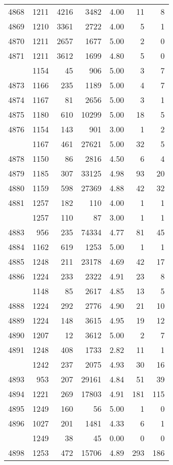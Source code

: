 \documentclass[
]{article}
\begin{document}
\begin{table}
\begin{tabular}[t]{lrrrrrr}
4868 & 1211 & 4216 & 3482 & 4.00 & 11 & 8\\
4869 & 1210 & 3361 & 2722 & 4.00 & 5 & 1\\
4870 & 1211 & 2657 & 1677 & 5.00 & 2 & 0\\
4871 & 1211 & 3612 & 1699 & 4.80 & 5 & 0\\
\addlinespace
4872 & 1154 & 45 & 906 & 5.00 & 3 & 7\\
4873 & 1166 & 235 & 1189 & 5.00 & 4 & 7\\
4874 & 1167 & 81 & 2656 & 5.00 & 3 & 1\\
4875 & 1180 & 610 & 10299 & 5.00 & 18 & 5\\
4876 & 1154 & 143 & 901 & 3.00 & 1 & 2\\
\addlinespace
4877 & 1167 & 461 & 27621 & 5.00 & 32 & 5\\
4878 & 1150 & 86 & 2816 & 4.50 & 6 & 4\\
4879 & 1185 & 307 & 33125 & 4.98 & 93 & 20\\
4880 & 1159 & 598 & 27369 & 4.88 & 42 & 32\\
4881 & 1257 & 182 & 110 & 4.00 & 1 & 1\\
\addlinespace
4882 & 1257 & 110 & 87 & 3.00 & 1 & 1\\
4883 & 956 & 235 & 74334 & 4.77 & 81 & 45\\
4884 & 1162 & 619 & 1253 & 5.00 & 1 & 1\\
4885 & 1248 & 211 & 23178 & 4.69 & 42 & 17\\
4886 & 1224 & 233 & 2322 & 4.91 & 23 & 8\\
\addlinespace
4887 & 1148 & 85 & 2617 & 4.85 & 13 & 5\\
4888 & 1224 & 292 & 2776 & 4.90 & 21 & 10\\
4889 & 1224 & 148 & 3615 & 4.95 & 19 & 12\\
4890 & 1207 & 12 & 3612 & 5.00 & 2 & 7\\
4891 & 1248 & 408 & 1733 & 2.82 & 11 & 1\\
\addlinespace
4892 & 1242 & 237 & 2075 & 4.93 & 30 & 16\\
4893 & 953 & 207 & 29161 & 4.84 & 51 & 39\\
4894 & 1221 & 269 & 17803 & 4.91 & 181 & 115\\
4895 & 1249 & 160 & 56 & 5.00 & 1 & 0\\
4896 & 1027 & 201 & 1481 & 4.33 & 6 & 1\\
\addlinespace
4897 & 1249 & 38 & 45 & 0.00 & 0 & 0\\
4898 & 1253 & 472 & 15706 & 4.89 & 293 & 186\\

\end{tabular}
\end{table}
\end{document}
